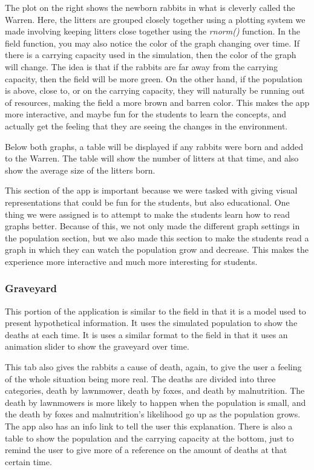 \documentclass{article}\usepackage[]{graphicx}\usepackage[]{color}
\begin{document}
The plot on the right shows the newborn rabbits in what is cleverly called the Warren. Here, the litters are grouped closely together using a plotting system we made involving keeping litters close together using the \textit{rnorm()} function. In the field function, you may also notice the color of the graph changing over time. If there is a carrying capacity used in the simulation, then the color of the graph will change. The idea is that if the rabbits are far away from the carrying capacity, then the field will be more green. On the other hand, if the population is above, close to, or on the carrying capacity, they will naturally be running out of resources, making the field a more brown and barren color. This makes the app more interactive, and maybe fun for the students to learn the concepts, and actually get the feeling that they are seeing the changes in the environment. 

Below both graphs, a table will be displayed if any rabbits were born and added to the Warren. The table will show the number of litters at that time, and also show the average size of the litters born.

This section of the app is important because we were tasked with giving visual representations that could be fun for the students, but also educational. One thing we were assigned is to attempt to make the students learn how to read graphs better. Because of this, we not only made the different graph settings in the population section, but we also made this section to make the students read a graph in which they can watch the population grow and decrease. This makes the experience more interactive and much more interesting for students.

\subsubsection{Graveyard}

This portion of the application is similar to the field in that it is a model used to present hypothetical information. It uses the simulated population to show the deaths at each time. It is uses a similar format to the field in that it uses an animation slider to show the graveyard over time. 

This tab also gives the rabbits a cause of death, again, to give the user a feeling of the whole situation being more real. The deaths are divided into three categories, death by lawnmower, death by foxes, and death by malnutrition. The death by lawnmowers is more likely to happen when the population is small, and the death by foxes and malnutrition's likelihood go up as the population grows. The app also has an info link to tell the user this explanation. There is also a table to show the population and the carrying capacity at the bottom, just to remind the user to give more of a reference on the amount of deaths at that certain time. 
\end{document}
